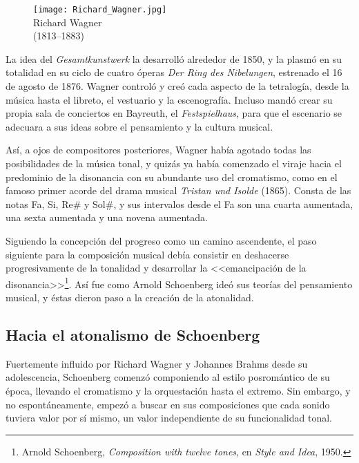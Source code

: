		\begin{figure}
			\begin{center}
				\texttt{[image: Richard\_Wagner.jpg]}\\	
				{Richard Wagner\\(1813--1883)}
			\end{center}
		\end{figure}
		
		La idea del \emph{Gesamtkunstwerk} la desarroll\'o alrededor de 1850, y la plasm\'o en su totalidad en su ciclo de cuatro \'operas \emph{Der Ring des Nibelungen}, estrenado el 16 de agosto de 1876. Wagner control\'o y cre\'o cada aspecto de la tetralog\'ia, desde la m\'usica hasta el libreto, el vestuario y la escenograf\'ia. Incluso mand\'o crear su propia sala de conciertos en Bayreuth, el \emph{Festspielhaus}, para que el escenario se adecuara a sus ideas sobre el pensamiento y la cultura musical.
	
		As\'i, a ojos de compositores posteriores, Wagner hab\'ia agotado todas las posibilidades de la m\'usica tonal, y quiz\'as ya hab\'ia comenzado el viraje hacia el predominio de la disonancia con su abundante uso del cromatismo, como en el famoso primer acorde del drama musical \emph{Tristan und Isolde} (1865). Consta de las notas Fa, Si, $\mbox{Re\#}$ y $\mbox{Sol\#}$, y sus intervalos desde el Fa son una cuarta aumentada, una sexta aumentada y una novena aumentada.
		
		Siguiendo la concepci\'on del progreso como un camino ascendente, el paso siguiente para la composici\'on musical deb\'ia consistir en deshacerse progresivamente de la tonalidad y desarrollar la <<{emancipaci\'on de la disonancia}>>\footnote{Arnold Schoenberg, \emph{Composition with twelve tones}, en \emph{Style and Idea}, 1950.}. As\'i fue como Arnold Schoenberg ide\'o sus teor\'ias del pensamiento musical, y \'estas dieron paso a la creaci\'on de la atonalidad. \cite{kinney}
	
	\subsection{Hacia el atonalismo de Schoenberg}
		Fuertemente influido por Richard Wagner y Johannes Brahms desde su adolescencia, Schoenberg comenz\'o componiendo al estilo posrom\'antico de su \'epoca, llevando el cromatismo y la orquestaci\'on hasta el extremo. Sin embargo, y no espont\'aneamente, empez\'o a buscar en sus composiciones que cada sonido tuviera valor por s\'i mismo, un valor independiente de su funcionalidad tonal. 
		
